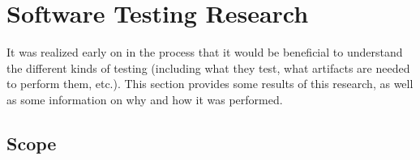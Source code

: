 \newcommand{\procLevel}[1]{``Test level'' can also refer to the scope
of a test process; for example, ``across the whole organization'' or only
``to specific projects'' #1[p.~24]{IEEE2022}}
\newcommand{\phaseDef}{can also refer to the ``period of time in the software
      life cycle'' when testing occurs \citeyearpar[p.~470]{IEEE2017}, usually
      after the implementation phase (\citeyear[pp.~420,~509]{IEEE2017};
      \citealp[p.~56]{Perry2006}).}

\newcommand{\distinctIEEE}[1]{distinct from the notion of ``test #1'' described
      in \nameref{tab:ieeeTestTerms}.}
\newcommand{\notDefDistinctIEEE}[1]{\footnote{Not formally defined, but
            \distinctIEEE{#1}}}
\newcommand{\gerrardDistinctIEEE}[1]{\footnote{``Each type of test addresses a
            different risk area'' \citep[p.~12]{Gerrard2000a}, which is
            \distinctIEEE{#1}}}

\chapter{Software Testing Research}
\label{chap:testing}

It was realized early on in the process that it would be beneficial to
understand the different kinds of testing (including what they test, what
artifacts are needed to perform them, etc.). This section provides some results
of this research, as well as some information on why and how it was performed.

\section{Scope}
\label{chap:testing:sec:scope}

\newcommand{\accelTolTest}{astronauts \citep[p.~11]{MorgunEtAl1999}, aviators
      \citep[pp.~27,~42]{HoweAndJohnson1995}, or catalysts
      \citep[p.~1463]{LiuEtAl2023}}

